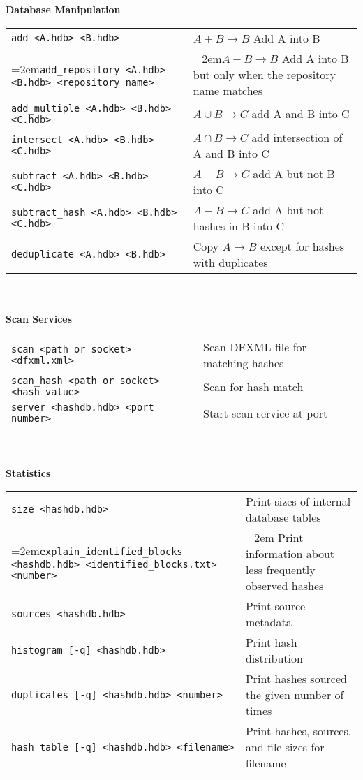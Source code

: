 \documentclass[12pt]{article}
\begin{document}
\textbf{Database Manipulation} \\
\begin{tabular}{p{3.6 in} p{3.4 in}}
\small\texttt{add <A.hdb> <B.hdb>} & $A + B \rightarrow B$ Add A into B \\
\hangindent=2em\small\texttt{add\_repository <A.hdb> <B.hdb> <repository name>} & \hangindent=2em$A + B \rightarrow B$ Add A into B but only when the repository name matches \\
\small\texttt{add\_multiple <A.hdb> <B.hdb> <C.hdb>} & $A \cup B \rightarrow C$ add A and B into C\\
\small\texttt{intersect <A.hdb> <B.hdb> <C.hdb>} & $A \cap B \rightarrow C$ add intersection of A and B into C\\
\small\texttt{subtract <A.hdb> <B.hdb> <C.hdb>} & $A - B \rightarrow C$ add A but not B into C\\
\small\texttt{subtract\_hash <A.hdb> <B.hdb> <C.hdb>} & $A - B \rightarrow C$ add A but not hashes in B into C\\
\small\texttt{deduplicate <A.hdb> <B.hdb>} & Copy $A \rightarrow B$ except for hashes with duplicates \\
\end{tabular}
\\
\\
\textbf{Scan Services} \\
\begin{tabular}{p{3.6 in} p{4 in}}
\small\texttt{scan <path or socket> <dfxml.xml>} & Scan DFXML file for matching hashes \\
\small\texttt{scan\_hash <path or socket> <hash value>} & Scan for hash match \\
\small\texttt{server <hashdb.hdb> <port number>} & Start scan service at port\\
\end{tabular}
\\
\\
\textbf{Statistics}\\
\begin{tabular}{p{3.6 in} p{3.6 in}}
\small\small\texttt{size <hashdb.hdb>} & Print sizes of internal database tables \\
\hangindent=2em\small\texttt{explain\_identified\_blocks <hashdb.hdb> <identified\_blocks.txt> <number>} & \hangindent=2em Print information about less frequently observed hashes\\
\small\texttt{sources <hashdb.hdb>} & Print source metadata \\
\small\texttt{histogram [-q] <hashdb.hdb>} & Print hash distribution \\
\small\texttt{duplicates [-q] <hashdb.hdb> <number>} & Print hashes sourced the given number of times \\
\small\texttt{hash\_table [-q] <hashdb.hdb> <filename>} & Print hashes, sources, and file sizes for filename\\
\end{tabular}
\end{document}
